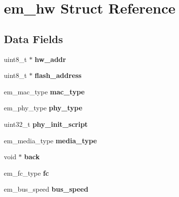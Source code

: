 \hypertarget{structem__hw}{}\section{em\+\_\+hw Struct Reference}
\label{structem__hw}
\subsection*{Data Fields}
\begin{DoxyCompactItemize}
\item 
\mbox{\label{structem__hw_af1c24ea31e061edb7f7c54e02c26f3fb}} 
uint8\+\_\+t $\ast$ {\bfseries hw\+\_\+addr}
\item 
\mbox{\label{structem__hw_a112e2c7441f1addf5f5bc8dc5c9c6afc}} 
uint8\+\_\+t $\ast$ {\bfseries flash\+\_\+address}
\item 
\mbox{\label{structem__hw_a7998e7f3d7962b8e8c917fb3bb8e96c3}} 
em\+\_\+mac\+\_\+type {\bfseries mac\+\_\+type}
\item 
\mbox{\label{structem__hw_a3fc9aafaa27502f6fc19a0e45b1b048b}} 
em\+\_\+phy\+\_\+type {\bfseries phy\+\_\+type}
\item 
\mbox{\label{structem__hw_a150ab6c1cb3aba5360bd951218722fe8}} 
uint32\+\_\+t {\bfseries phy\+\_\+init\+\_\+script}
\item 
\mbox{\label{structem__hw_a3b2ab9129ca784016327f483649ec121}} 
em\+\_\+media\+\_\+type {\bfseries media\+\_\+type}
\item 
\mbox{\label{structem__hw_a53f053863b71aa8149705fcd8ada4883}} 
void $\ast$ {\bfseries back}
\item 
\mbox{\label{structem__hw_a9330c0f16fd46d891b1ce67fa366d88a}} 
em\+\_\+fc\+\_\+type {\bfseries fc}
\item 
\mbox{\label{structem__hw_af13cd641d091c5a2bf6e26a1a65fb84b}} 
em\+\_\+bus\+\_\+speed {\bfseries bus\+\_\+speed}
\item 
\mbox{\label{structem__hw_a74bb6bef41854a7d5bf5a05df827c8b7}} 

\end{DoxyCompactItemize}
